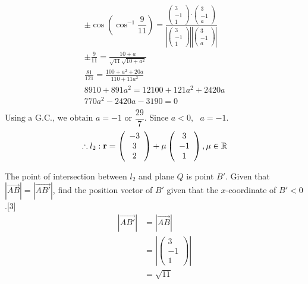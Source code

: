 \documentclass[12pt, a4 paper]{article}
\begin{document}
\begin{outline}[enumerate]
					\color{blue}
					\[\begin{array}{l} \pm \cos \left( {{{\cos }^{ - 1}}\dfrac{9}{{11}}} \right) = \frac{{\left( {\begin{array}{*{20}{c}}3\\{ - 1}\\1\end{array}} \right) \cdot \left( {\begin{array}{*{20}{c}}3\\{ - 1}\\a\end{array}} \right)}}{{\left| {\left( {\begin{array}{*{20}{c}}3\\{ - 1}\\1\end{array}} \right)} \right|\left| {\left( {\begin{array}{*{20}{c}}3\\{ - 1}\\a\end{array}} \right)} \right|}}\\ \pm \frac{9}{{11}} = \frac{{10 + a}}{{\sqrt {11} \sqrt {10 + {a^2}} }}\\\frac{{81}}{{121}} = \frac{{100 + {a^2} + 20a}}{{110 + 11{a^2}}}\\8910 + 891{a^2} = 12100 + 121{a^2} + 2420a\\770{a^2} - 2420a - 3190 = 0\\\end{array}\]
					${\textrm{Using a G}}{\textrm{.C}}{\textrm{., we obtain }}a =  - 1{\textrm{ or }}\dfrac{{29}}{7}.{\textrm{ Since }}a < 0,{\textrm{ }}a =  - 1.$
					\[\therefore {l_2}:{\bf{r}} = \left( {\begin{array}{*{20}{c}}{ - 3}\\3\\2\end{array}} \right) + \mu \left( {\begin{array}{*{20}{c}}3\\{ - 1}\\1\end{array}} \right),\mu  \in \mathbb{R}\]

					\color{black}

					\2 	The point of intersection between ${l_2}$ and plane $Q$ is point $B'$. Given that $\left| {\overrightarrow {AB} } \right| = \left| {\overrightarrow {AB'} } \right|$, find the position vector of $B'$ given that the $x$-coordinate of $B' < 0$.\hfill[3]
					\color{blue}
					\begin{align*}
						\left| {\overrightarrow {AB'} } \right| & = \left| {\overrightarrow {AB} } \right| \\ &= \left| {\left( {\begin{array}{*{20}{c}}3\\{ - 1}\\1\end{array}} \right)} \right|\\ &= \sqrt {11}
					\end{align*}


\end{outline}
\end{document}

